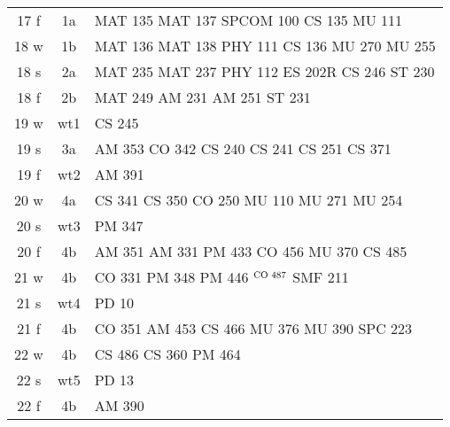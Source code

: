 \documentclass[convert]{standalone}
\newcommand{\opt}[1]{{\color{gray!50}#1}}
\newcommand{\opw}[1]{{\color{white}#1}}
\begin{document}
\begin{tabular}{|c | c | l |}
	\hline
	17 f & 1a & MAT 135 \quad MAT 137 \quad SPCOM 100 \quad CS 135 \quad MU 111 \\
	18 w & 1b & MAT 136 \quad MAT 138 \quad PHY 111 \quad CS 136 \quad MU 270 \quad MU 255\\
	18 s & 2a & MAT 235 \quad MAT 237 \quad PHY 112 \quad ES 202R \quad CS 246 \quad ST  230 \\
	18 f & 2b & MAT 249 \quad AM 231 \quad AM 251 \quad ST  231 \\
	19 w & wt1 & CS 245 \\
	19 s & 3a & AM 353 \quad CO 342 \quad CS 240 \quad CS 241 \quad CS 251 \quad CS 371 \\
	19 f & wt2 & AM 391 \\
	20 w & 4a & CS 341 \quad CS 350 \quad CO 250  \quad MU 110 \quad MU 271 \quad MU 254 \\
	20 s & wt3 & PM 347 \\
	20 f & 4b & AM 351 \quad AM 331  \quad PM 433  \quad CO 456 \quad MU 370 \quad CS 485 \\
	21 w & 4b &  CO 331 \quad PM 348  \quad PM 446 \quad \opw{MU 371}  \quad \opw{EC 212}$^{\text{\scriptsize CO 487}}$ \quad SMF 211 \\
	21 s & wt4 & PD 10  \\
	21 f & 4b & CO 351  \quad AM 453 \quad CS 466 \quad MU 376 \quad MU 390 \quad SPC 223    \\
	22 w & 4b & CS 486 \quad CS 360 \quad PM 464    \\
	22 s & wt5 & PD 13 \\
	22 f & 4b &  \opt{AM 390}   \\\hline

\end{tabular}
\end{document}
